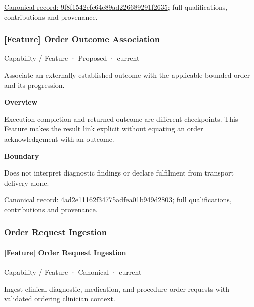 {\footnotesize \href{../../../../continuum/strategy/capability/feature/9f8f1542efc64e89ad226689291f2635.md}{Canonical record: 9f8f1542efc64e89ad226689291f2635}; full qualifications, contributions and provenance.}\par
\subsubsection{[Feature] Order Outcome Association}

\label{element:4ad2e11162f34775adfea01b949d2803}
{\small Capability / Feature · Proposed · current}\par

Associate an externally established outcome with the applicable bounded order and its progression.



\textbf{Overview}



Execution completion and returned outcome are different checkpoints. This Feature makes the result link explicit without equating an order acknowledgement with an outcome.



\textbf{Boundary}



Does not interpret diagnostic findings or declare fulfilment from transport delivery alone.


{\footnotesize \href{../../../../continuum/strategy/capability/feature/4ad2e11162f34775adfea01b949d2803.md}{Canonical record: 4ad2e11162f34775adfea01b949d2803}; full qualifications, contributions and provenance.}\par
\subsubsection{Order Request Ingestion}

\paragraph{[Feature] Order Request Ingestion}

\label{element:fc1f8168fd6949beb810e4ff57a2368e}
{\small Capability / Feature · Canonical · current}\par

Ingest clinical diagnostic, medication, and procedure order requests with validated ordering clinician context.



